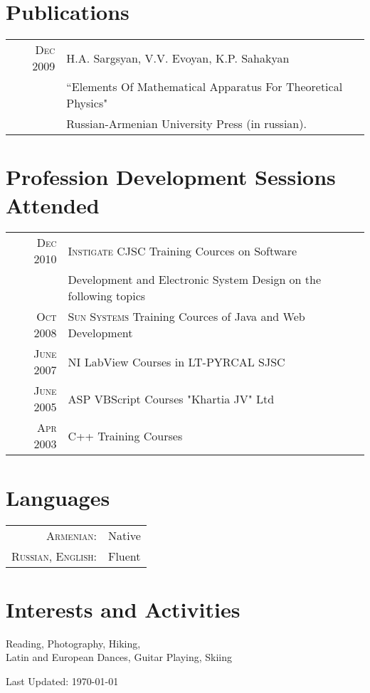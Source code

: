 \documentclass[a4paper,10pt]{article}
\begin{document}
\section{Publications}
\begin{tabular}{rl}
 \textsc{Dec} 2009 & H.A. Sargsyan, V.V. Evoyan, K.P. Sahakyan \\ & ``Elements
 Of Mathematical Apparatus For Theoretical Physics" \\ & Russian-Armenian
 University Press (in russian).
\end{tabular}

\section{Profession Development Sessions Attended}
\begin{tabular}{rl}
\textsc{Dec} 2010 & \textsc{Instigate CJSC} Training Cources on Software \\
                  & Development and Electronic System Design on the following topics \\
\textsc{Oct} 2008 & \textsc{Sun Systems} Training Cources of Java and Web
					Development \\
\textsc{June} 2007 & NI LabView Courses in LT-PYRCAL SJSC \\
\textsc{June} 2005 & ASP VBScript Courses "Khartia JV" Ltd \\
\textsc{Apr} 2003 & C++ Training Courses

\end{tabular}


\section{Languages}
\begin{tabular}{rl}
 \textsc{Armenian:}&Native\\
 \textsc{Russian, English:}&Fluent\\
\end{tabular}

\section{Interests and Activities}
Reading, Photography, Hiking,  \\
Latin and European Dances, Guitar Playing, Skiing

\vfill
\hfill \footnotesize{Last Updated: \mydate\today }
\end{document}
